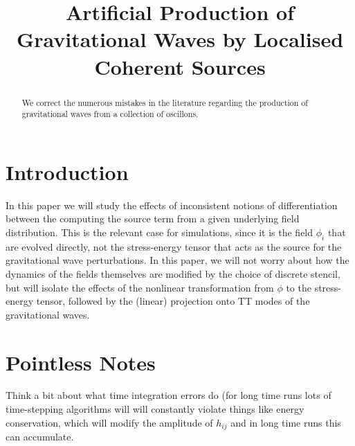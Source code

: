\documentclass{revtex4}
\title{Artificial Production of Gravitational Waves by Localised Coherent Sources}
\begin{document}
\begin{abstract}
We correct the numerous mistakes in the literature regarding the production of gravitational waves from a collection of oscillons.
\end{abstract}
\maketitle

\section{Introduction}
In this paper we will study the effects of inconsistent notions of differentiation between the computing the source term from a given underlying field distribution.
This is the relevant case for simulations, since it is the field $\phi_i$ that are evolved directly, not the stress-energy tensor that acts as the source for the gravitational wave perturbations.
In this paper, we will not worry about how the dynamics of the fields themselves are modified by the choice of discrete stencil, but will isolate the effects of the nonlinear transformation from $\phi$ to the stress-energy tensor, followed by the (linear) projection onto TT modes of the gravitational waves.





\section{Pointless Notes}
Think a bit about what time integration errors do (for long time runs lots of time-stepping algorithms will will constantly violate things like energy conservation, which will modify the amplitude of $h_{ij}$ and in long time runs this can accumulate.
\end{document}
